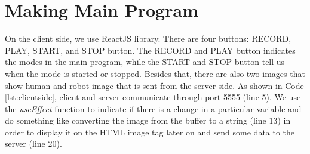 \section{Making Main Program}
\label{sec:makingmainprogram}



On the client side, we use ReactJS library. There are four buttons: RECORD, PLAY, START, and STOP button. The RECORD and PLAY button indicates the modes in the main program, while the START and STOP button tell us when the mode is started or stopped.
Besides that, there are also two images that show human and robot image that is sent from the server side. As shown in Code \ref{lst:clientside}, client and server communicate through port 5555 (line 5).
We use the \emph{useEffect} function to indicate if there is a change in a particular variable and do something like converting the image from the buffer to a string (line 13) in order to display it on the HTML image tag later on and send some data to the server (line 20).

